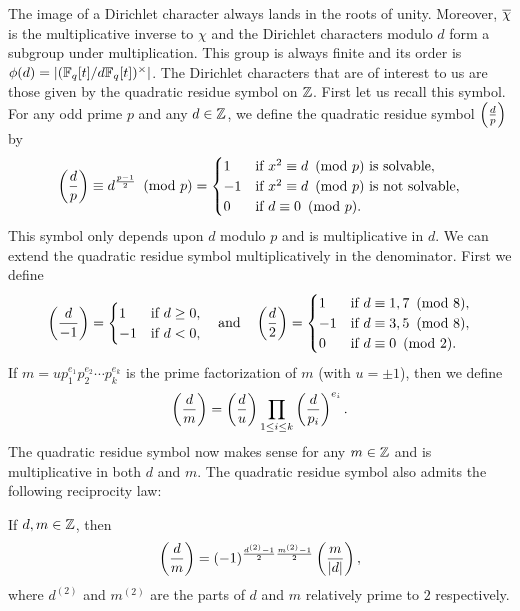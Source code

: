     The image of a Dirichlet character always lands in the roots of unity. Moreover, $\overline{\chi}$ is the multiplicative inverse to $\chi$ and the Dirichlet characters modulo $d$ form a subgroup under multiplication. This group is always finite and its order is $\phi(d) = |(\mathbb{F}_{q}[t]/d\mathbb{F}_{q}[t])^{\times}|$. The Dirichlet characters that are of interest to us are those given by the quadratic residue symbol on $\mathbb{Z}$. First let us recall this symbol. For any odd prime $p$ and any $d \in \mathbb{Z}$, we define the quadratic residue symbol $\textstyle{\left(\frac{d}{p}\right)}$ by
    \[
        \left(\frac{d}{p}\right) \equiv d^{\frac{p-1}{2}} \ \left(\text{mod }p\right) = \begin{cases} 1 & \text{if $x^{2} \equiv d \ \left(\text{mod }p\right)$ is solvable}, \\ -1 & \text{if $x^{2} \equiv d \ \left(\text{mod }p\right)$ is not solvable}, \\ 0 & \text{if $d \equiv 0 \ \left(\text{mod }p\right)$}. \end{cases}
    \]
    This symbol only depends upon $d$ modulo $p$ and is multiplicative in $d$. We can extend the quadratic residue symbol multiplicatively in the denominator. First we define
    \[
        \left(\frac{d}{-1}\right) = \begin{cases} 1 & \text{if $d \ge 0$}, \\ -1 & \text{if $d < 0$}, \end{cases} \quad \text{and} \quad \left(\frac{d}{2}\right) = \begin{cases} 1 & \text{if $d \equiv 1,7 \ \left(\text{mod }8\right)$}, \\ -1 & \text{if $d \equiv 3,5 \ \left(\text{mod }8\right)$}, \\ 0 & \text{if $d \equiv 0 \ \left(\text{mod }2\right)$}. \end{cases}
    \]
    If $m = up_{1}^{e_{1}}p_{2}^{e_{2}} \cdots p_{k}^{e_{k}}$ is the prime factorization of $m$ (with $u = \pm1$), then we define
    \[
        \left(\frac{d}{m}\right) = \left(\frac{d}{u}\right)\prod_{1 \le i \le k}\left(\frac{d}{p_{i}}\right)^{e_{i}}.
    \]
    The quadratic residue symbol now makes sense for any $m \in \mathbb{Z}$ and is multiplicative in both $d$ and $m$. The quadratic residue symbol also admits the following reciprocity law:

    \begin{theorem}
        If $d,m \in \mathbb{Z}$, then
        \[
            \left(\frac{d}{m}\right) = (-1)^{\frac{d^{(2)}-1}{2}\frac{m^{(2)}-1}{2}}\left(\frac{m}{|d|}\right),
        \]
        where $d^{(2)}$ and $m^{(2)}$ are the parts of $d$ and $m$ relatively prime to $2$ respectively.
    \end{theorem}

